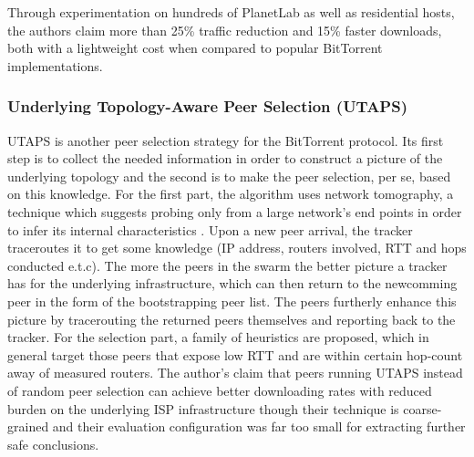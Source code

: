 
Through experimentation on hundreds of PlanetLab as well as residential hosts,
the authors claim more than 25\% traffic reduction and 15\% faster downloads,
both with a lightweight cost when compared to popular BitTorrent
implementations.

\subsubsection{Underlying Topology-Aware Peer Selection (UTAPS)}
UTAPS \cite{lcy_utaps_2008} is another peer selection strategy for the
BitTorrent protocol. Its first step is to collect the needed information in
order to construct a picture of the underlying topology and the second is to
make the peer selection, per se, based on this knowledge. For the first part,
the algorithm uses network tomography, a technique which suggests probing only
from a large network's end points in order to infer its internal characteristics
\cite{chny_tomography_2002}. Upon a new peer arrival, the tracker traceroutes it
to get some knowledge (IP address, routers involved, RTT and hops conducted
e.t.c). The more the peers in the swarm the better picture a tracker has for the
underlying infrastructure, which can then return to the newcomming peer in the
form of the bootstrapping peer list. The peers furtherly enhance this picture by
tracerouting the returned peers themselves and reporting back to the tracker.
For the selection part, a family of heuristics are proposed, which in general
target those peers that expose low RTT and are within certain hop-count away of
measured routers. The author's claim that peers running UTAPS instead of random
peer selection can achieve better downloading rates with reduced burden on the
underlying ISP infrastructure though their technique is coarse-grained and their
evaluation configuration was far too small for extracting further safe
conclusions.

